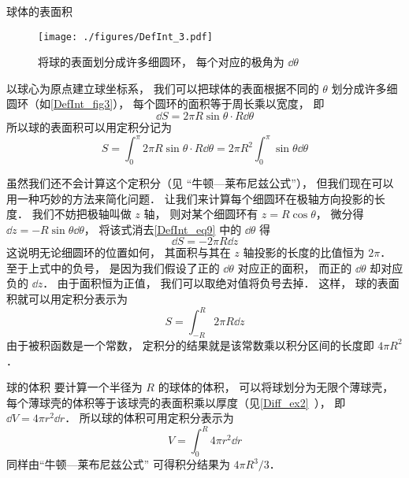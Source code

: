 \begin{example}{球体的表面积}\label{DefInt_ex3}

\begin{figure}[ht]
\centering
\texttt{[image: ./figures/DefInt\_3.pdf]}
\caption{将球的表面划分成许多细圆环， 每个对应的极角为 $\dd{\theta}$} \label{DefInt_fig3}
\end{figure}

以球心为原点建立球坐标系， 我们可以把球体的表面根据不同的 $\theta$ 划分成许多细圆环（如\autoref{DefInt_fig3}）， 每个圆环的面积等于周长乘以宽度， 即
\begin{equation}\label{DefInt_eq9}
\dd{S} = 2\pi R\sin\theta \cdot R\dd{\theta}
\end{equation}
所以球的表面积可以用定积分记为
\begin{equation}
S = \int_0^{\pi} 2\pi R\sin\theta \cdot R\dd{\theta} = 2\pi R^2 \int_0^{\pi} \sin\theta \dd{\theta}
\end{equation}

虽然我们还不会计算这个定积分（见 “牛顿—莱布尼兹公式”）， 但我们现在可以用一种巧妙的方法来简化问题． 让我们来计算每个细圆环在极轴方向投影的长度． 我们不妨把极轴叫做 $z$ 轴， 则对某个细圆环有 $z = R\cos\theta$， 微分得 $\dd{z} = -R\sin\theta \dd{\theta}$， 将该式消去\autoref{DefInt_eq9} 中的 $\dd{\theta}$ 得
\begin{equation}
\dd{S} = -2\pi R\dd{z}
\end{equation}
这说明无论细圆环的位置如何， 其面积与其在 $z$ 轴投影的长度的比值恒为 $2\pi$． 至于上式中的负号， 是因为我们假设了正的 $\dd{\theta}$ 对应正的面积， 而正的 $\dd{\theta}$ 却对应负的 $\dd{z}$． 由于面积恒为正值， 我们可以取绝对值将负号去掉． 这样， 球的表面积就可以用定积分表示为
\begin{equation}\label{DefInt_eq12}
S = \int_{-R}^{R} 2\pi R\dd{z}
\end{equation}
由于被积函数是一个常数， 定积分的结果就是该常数乘以积分区间的长度即 $4\pi R^2$．
\end{example}

\begin{example}{球的体积}\label{DefInt_ex4}
要计算一个半径为 $R$ 的球体的体积， 可以将球划分为无限个薄球壳， 每个薄球壳的体积等于该球壳的表面积乘以厚度（见\autoref{Diff_ex2}~）， 即 $\dd{V} = 4\pi r^2 \dd{r}$． 所以球的体积可用定积分表示为
\begin{equation}
V = \int_0^R 4\pi r^2 \dd{r}
\end{equation}
同样由“牛顿—莱布尼兹公式” 可得积分结果为 $4\pi R^3/3$．
\end{example}

